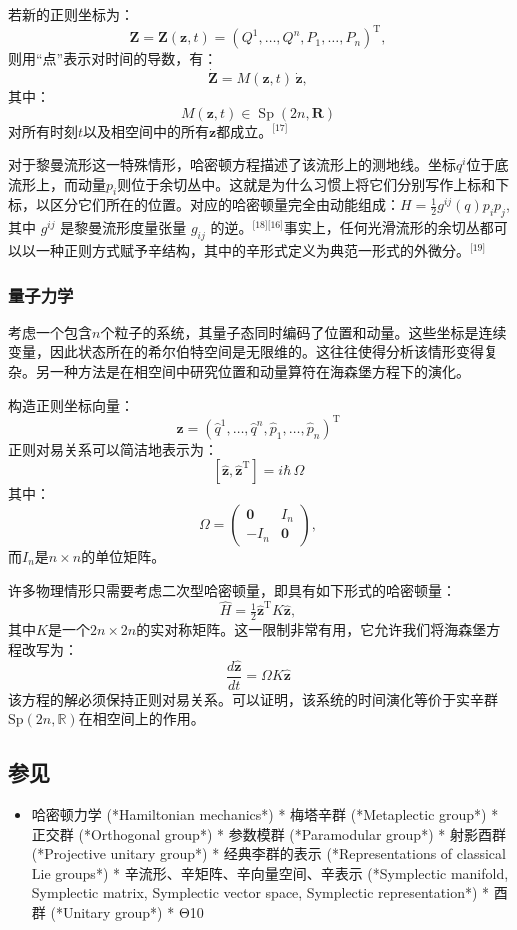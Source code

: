 若新的正则坐标为：
$$
\mathbf{Z} = \mathbf{Z}(\mathbf{z}, t) = (Q^{1}, \ldots, Q^{n}, P_{1}, \ldots, P_{n})^{\mathrm{T}},~
$$
则用“点”表示对时间的导数，有：
$$
\dot{\mathbf{Z}} = M(\mathbf{z}, t) \, \dot{\mathbf{z}},~
$$
其中：
$$
M(\mathbf{z}, t) \in \operatorname{Sp}(2n, \mathbf{R})~
$$
对所有时刻$t$以及相空间中的所有$\mathbf{z}$都成立。\(^\text{[17]}\)

对于黎曼流形这一特殊情形，哈密顿方程描述了该流形上的测地线。坐标$q^{i}$位于底流形上，而动量$p_{i}$则位于余切丛中。这就是为什么习惯上将它们分别写作上标和下标，以区分它们所在的位置。对应的哈密顿量完全由动能组成：$H = \tfrac{1}{2} g^{ij}(q) p_{i} p_{j}$,其中 $g^{ij}$ 是黎曼流形度量张量 $g_{ij}$ 的逆。\(^\text{[18][16]}\)事实上，任何光滑流形的余切丛都可以以一种正则方式赋予辛结构，其中的辛形式定义为典范一形式的外微分。\(^\text{[19]}\)
\subsubsection{量子力学}
考虑一个包含$n$个粒子的系统，其量子态同时编码了位置和动量。这些坐标是连续变量，因此状态所在的希尔伯特空间是无限维的。这往往使得分析该情形变得复杂。另一种方法是在相空间中研究位置和动量算符在海森堡方程下的演化。

构造正则坐标向量：
$$
\mathbf{\hat{z}} = (\hat{q}^{1}, \ldots, \hat{q}^{n}, \hat{p}_{1}, \ldots, \hat{p}_{n})^{\mathrm{T}}~
$$
正则对易关系可以简洁地表示为：
$$
[\mathbf{\hat{z}}, \mathbf{\hat{z}}^{\mathrm{T}}] = i \hbar \, \Omega~
$$
其中：
$$
\Omega = 
\begin{pmatrix}
\mathbf{0} & I_{n} \\
- I_{n} & \mathbf{0}
\end{pmatrix},~
$$
而$I_n$是$n \times n$的单位矩阵。

许多物理情形只需要考虑二次型哈密顿量，即具有如下形式的哈密顿量：
$$
\hat{H} = \tfrac{1}{2} \mathbf{\hat{z}}^{\mathrm{T}} K \mathbf{\hat{z}},~
$$
其中$K$是一个$2n \times 2n$的实对称矩阵。这一限制非常有用，它允许我们将海森堡方程改写为：
$$
\frac{d \mathbf{\hat{z}}}{dt} = \Omega K \mathbf{\hat{z}}~
$$
该方程的解必须保持正则对易关系。可以证明，该系统的时间演化等价于实辛群 $\mathrm{Sp}(2n, \mathbb{R})$在相空间上的作用。
\subsection{参见}
\begin{itemize}
\item 哈密顿力学 (*Hamiltonian mechanics*)
* 梅塔辛群 (*Metaplectic group*)
* 正交群 (*Orthogonal group*)
* 参数模群 (*Paramodular group*)
* 射影酉群 (*Projective unitary group*)
* 经典李群的表示 (*Representations of classical Lie groups*)
* 辛流形、辛矩阵、辛向量空间、辛表示
  (*Symplectic manifold, Symplectic matrix, Symplectic vector space, Symplectic representation*)
* 酉群 (*Unitary group*)
* Θ10

\end{itemize}
